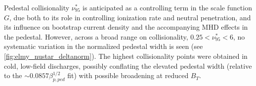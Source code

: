 \begin{figure}[ht]
 \pushtooutside
\end{figure}

Pedestal collisionality $\nu^*_{95}$ is anticipated as a controlling term in the scale function $G$, due both to its role in controlling ionization rate and neutral penetration, and its influence on bootstrap current density and the accompanying MHD effects in the pedestal.  However, across a broad range on collisionality, $0.25 < \nu^*_{95} < 6$, no systematic variation in the normalized pedestal width is seen (see \cref{fig:elmy_nustar_deltanorm}).  The highest collisionality points were obtained in cold, low-field discharges, possibly conflating the elevated pedestal width (relative to the $\sim 0.0857 \beta_{p,ped}^{1/2}$ fit) with possible broadening at reduced $B_T$.

